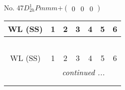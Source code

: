 \documentclass[fleqn,9pt,landscape]{jsarticle}
\begin{document}
\newpage
No. 47\quad$D_{2h}^{1}$\quad$Pmmm$\quad[ orthorhombic ]\quad$+\begin{pmatrix} 0 & 0 & 0 \end{pmatrix}$
\begin{center}
\renewcommand{\arraystretch}{1.2}
\begin{longtable}{ccccccc}
 \hline \hline
WL (SS) & 1 & 2 & 3 & 4 & 5 & 6 \\ \hline \endfirsthead

\multicolumn{6}{l}{\tablename\ \thetable{}} \\
 \hline \hline
WL (SS) & 1 & 2 & 3 & 4 & 5 & 6 \\ \hline \endhead

 \hline \hline
\multicolumn{6}{r}{\footnotesize\it continued ...} \\ \endfoot

 \hline \hline
\multicolumn{6}{r}{} \\ \endlastfoot


\end{longtable}
\end{center}
\end{document}
